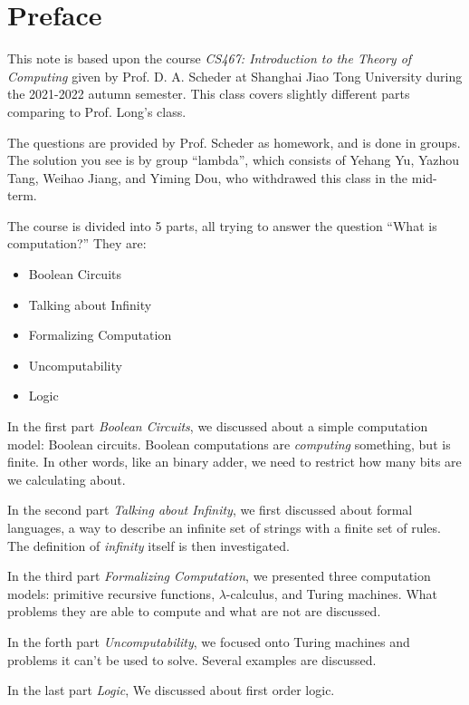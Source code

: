\section*{Preface}

This note is based upon the course \emph{CS467: Introduction to the Theory of Computing} given by Prof. D. A. Scheder at Shanghai Jiao Tong University during the 2021-2022 autumn semester. This class covers slightly different parts comparing to Prof. Long's class.

The questions are provided by Prof. Scheder as homework, and is done in groups. The solution you see is by group ``lambda'', which consists of Yehang Yu, Yazhou Tang, Weihao Jiang, and Yiming Dou, who withdrawed this class in the mid-term.

The course is divided into 5 parts, all trying to answer the question ``What is computation?'' They are:

\begin{itemize}
    \item Boolean Circuits
    \item Talking about Infinity
    \item Formalizing Computation
    \item Uncomputability
    \item Logic
\end{itemize}

In the first part \emph{Boolean Circuits}, we discussed about a simple computation model: Boolean circuits. Boolean computations are \emph{computing} something, but is finite. In other words, like an binary adder, we need to restrict how many bits are we calculating about.

In the second part \emph{Talking about Infinity}, we first discussed about formal languages, a way to describe an infinite set of strings with a finite set of rules. The definition of \emph{infinity} itself is then investigated.

In the third part \emph{Formalizing Computation}, we presented three computation models: primitive recursive functions, $\lambda$-calculus, and Turing machines. What problems they are able to compute and what are not are discussed.

In the forth part \emph{Uncomputability}, we focused onto Turing machines and problems it can't be used to solve. Several examples are discussed.

In the last part \emph{Logic}, We discussed about first order logic.